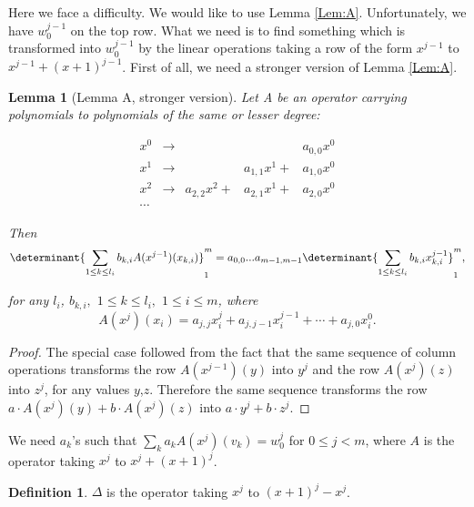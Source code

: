 \documentclass[10pt,reqno]{amsart}
\theoremstyle{plain}
\newtheorem{Lem}[Thm]{Lemma}
\theoremstyle{definition}
\newtheorem{Def}{Definition}
\theoremstyle{remark}
\begin{document}
Here we face a difficulty. We would like to use Lemma \ref{Lem:A}. 
Unfortunately, we have $w_0^{j-1}$ on the top row. What we need is to 
find something which
is transformed into $w_0^{j-1}$ by the linear operations taking a row of
the form $x^{j-1}$ to $x^{j-1} + (x+1)^{j-1}$. First of all, we need a 
stronger version of Lemma \ref{Lem:A}.

\begin{Lem}[Lemma A, stronger version]
Let A be an operator carrying polynomials to
polynomials of the same or lesser degree:

\begin{equation}
\begin{matrix}
x^0 & \to & & & a_{0,0} x^0\\
x^1 & \to & & a_{1,1} x^1 + & a_{1,0} x^0\\
x^2 & \to & a_{2,2} x^2 + & a_{2,1} x^1 + & a_{2,0} x^0\\
\dotsb
\end{matrix}
\end{equation}

Then \begin{equation}
\determinant{\sum_{1\leq k\leq l_i} b_{k,i} A(x^{j-1})(x_{k,i})}_1^m 
= a_{0,0} ... a_{m-1,m-1} 
     \determinant{\sum_{1\leq k\leq l_i} b_{k,i} x_{k,i}^{j-1}}_1^m,
\end{equation}
                                                                         
for any $l_i$, $b_{k,i},$ $1\leq k\leq l_i,$ $1\leq i\leq m$, where 
\begin{equation}
A(x^j)(x_i) = 
      a_{j,j} x_i^j + a_{j,j-1} x_i^{j-1} + \dotsb + a_{j,0} x_i^0.
\end{equation}
\end{Lem}
\begin{proof}
The special case followed from the fact that
the same sequence of column operations transforms the row 
$A(x^{j-1})(y)$ into $y^j$
and the row $A(x^j)(z)$ into $z^j$, for any values $y$,$z$. Therefore the same
sequence transforms the row $a\cdot A(x^j)(y)+b\cdot A(x^j)(z)$ 
into $a\cdot y^j+b\cdot z^j$.
\end{proof}

We need $a_k$'s such that 
$\sum_k a_k A(x^j)(v_k) = w_0^j$ for $0\leq j<m$, 
where $A$ is the operator taking $x^j$ to $x^j + (x+1)^j$. 

\begin{Def}
$\Delta $ is the operator taking $x^j$ to $(x+1)^j-x^j$.
\end{Def}
\end{document}
